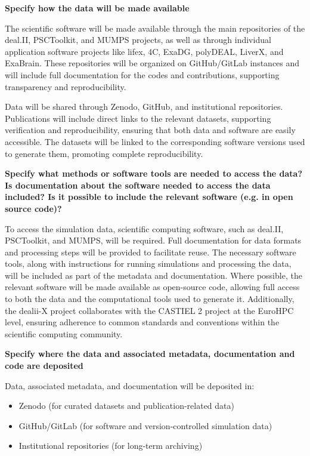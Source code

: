 \documentclass[a4paper,12pt]{article}
\begin{document}
\noindent \textbf{Specify how the data will be made available}

The scientific software will be made available through the main repositories of the deal.II, PSCToolkit, and MUMPS projects, as well as through individual application software projects like lifex, 4C, ExaDG, polyDEAL, LiverX, and ExaBrain. These repositories will be organized on GitHub/GitLab instances and will include full documentation for the codes and contributions, supporting transparency and reproducibility.

Data will be shared through Zenodo, GitHub, and institutional repositories. Publications will include direct links to the relevant datasets, supporting verification and reproducibility, ensuring that both data and software are easily accessible. The datasets will be linked to the corresponding software versions used to generate them, promoting complete reproducibility.

\noindent \textbf{Specify what methods or software tools are needed to access the data? Is documentation about the software needed to access the data included? Is it possible to include the relevant software (e.g. in open source code)?}

To access the simulation data, scientific computing software, such as deal.II, PSCToolkit, and MUMPS, will be required. Full documentation for data formats and processing steps will be provided to facilitate reuse. The necessary software tools, along with instructions for running simulations and processing the data, will be included as part of the metadata and documentation. Where possible, the relevant software will be made available as open-source code, allowing full access to both the data and the computational tools used to generate it. Additionally, the dealii-X project collaborates with the CASTIEL 2 project at the EuroHPC level, ensuring adherence to common standards and conventions within the scientific computing community.

\noindent \textbf{Specify where the data and associated metadata, documentation and code are deposited}

Data, associated metadata, and documentation will be deposited in:

\begin{itemize}
\item Zenodo (for curated datasets and publication-related data)
\item GitHub/GitLab (for software and version-controlled simulation data)
\item Institutional repositories (for long-term archiving)
\end{itemize}
\end{document}
